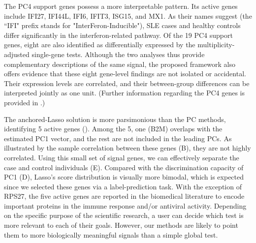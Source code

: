 \documentclass[11pt]{article}
\newenvironment{revblock}
  {\color{teal}}
  {}
\begin{document}
\begin{revblock}
    

The PC4 support genes possess a more interpretable pattern. Its active genes include IFI27, IFI44L, IFI6, IFIT3, ISG15, and MX1. As their names suggest (the ``IFI" prefix stands for "InterFeron-Inducible"), SLE cases and healthy controls differ significantly in the interferon-related pathway. Of the 19 PC4 support genes, eight are also identified as differentially expressed by the multiplicity-adjusted single-gene tests. Although the two analyses thus provide complementary descriptions of the same signal, the proposed framework also offers evidence that these eight gene-level findings are not isolated or accidental. Their expression levels are correlated, and their between-group differences can be interpreted jointly as one unit. (Further information regarding the PC4 genes is provided in .)

\end{revblock}


The anchored-Lasso solution is more parsimonious than the PC methods, identifying 5 active genes (). Among the 5, one (B2M) overlaps with the estimated PC1 vector, and the rest are not included in the leading PCs. As illustrated by the sample correlation between these genes (B), they are not highly correlated. Using this small set of signal genes, we can effectively separate the case and control individuals (E). Compared with the discrimination capacity of PC1 (D), Lasso's score distribution is visually more bimodal, which is expected since we selected these genes via a label-prediction task. With the exception of RPS27, the five active genes are reported in the biomedical literature to encode important proteins in the immune response and/or antiviral activity\cite{creus2012multifaceted,tang2021impact, largent2023dysregulated, takeuchi2019genome}. Depending on the specific purpose of the scientific research, a user can decide which test is more relevant to each of their goals. However, our methods are likely to point them to more biologically meaningful signals than a simple global test.
\end{document}
